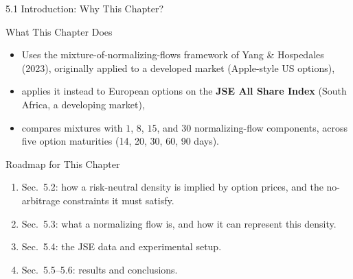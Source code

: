 \documentclass[aspectratio=169,10pt]{beamer}
\begin{document}
\begin{frame}[allowframebreaks]{5.1 Introduction: Why This Chapter?}
\begin{block}{What This Chapter Does}
\begin{itemize}
  \item Uses the mixture-of-normalizing-flows framework of Yang \& Hospedales
  (2023), originally applied to a developed market (Apple-style US options),
  \item applies it instead to European options on the \textbf{JSE All Share
  Index} (South Africa, a developing market),
  \item compares mixtures with $1$, $8$, $15$, and $30$ normalizing-flow
  components, across five option maturities (14, 20, 30, 60, 90 days).
\end{itemize}
\end{block}

\begin{block}{Roadmap for This Chapter}
\begin{enumerate}
  \item Sec.~5.2: how a risk-neutral density is implied by option prices,
  and the no-arbitrage constraints it must satisfy.
  \item Sec.~5.3: what a normalizing flow is, and how it can represent this
  density.
  \item Sec.~5.4: the JSE data and experimental setup.
  \item Sec.~5.5--5.6: results and conclusions.
\end{enumerate}
\end{block}

\end{frame}

\end{document}
